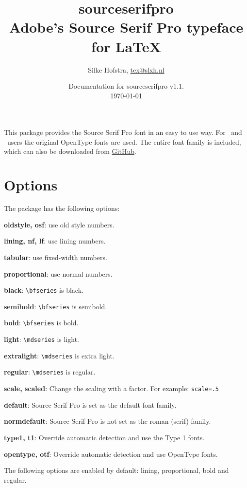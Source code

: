 \documentclass[10pt,a4paper,english]{article}
\title{\bfseries
	\Huge sourceserifpro\\
	\Large Adobe's Source Serif Pro typeface for \LaTeX
}
\author{Silke Hofstra, \href{mailto:tex@slxh.nl}{tex@slxh.nl}}
\date{Documentation for sourceserifpro v1.1.\\ \today}
\begin{document}
\maketitle
\begin{multicols}{2}
This package provides the Source Serif Pro font in an easy to use way. For \XeLaTeX\ and \LuaLaTeX\ users the original OpenType fonts are used. The entire font family is included, which can also be downloaded from \href{https://github.com/adobe-fonts/source-serif-pro}{GitHub}.

\section{Options}
The package has the following options:
\begin{itemize*}
	\item \textbf{oldstyle, osf}:  use old style numbers.
	\item \textbf{lining, nf, lf}: use lining numbers.
	\item \textbf{tabular}:        use fixed-width numbers.
	\item \textbf{proportional}:   use normal numbers.
	\item \textbf{black}:          \texttt{\textbackslash bfseries} is black.
	\item \textbf{semibold}:       \texttt{\textbackslash bfseries} is semibold.
	\item \textbf{bold}:           \texttt{\textbackslash bfseries} is bold.
	\item \textbf{light}:          \texttt{\textbackslash mdseries} is light.
	\item \textbf{extralight}:     \texttt{\textbackslash mdseries} is extra light.
	\item \textbf{regular}:        \texttt{\textbackslash mdseries} is regular.
	\item \textbf{scale, scaled}:  Change the scaling with a factor. For example:  \texttt{scale=.5}
	\item \textbf{default}:        Source Serif Pro is set as the default font family.
	\item \textbf{normdefault}:    Source Serif Pro is not set as the roman (serif) family.
	\item \textbf{type1, t1}:      Override automatic detection and use the Type 1 fonts.
	\item \textbf{opentype, otf}:  Override automatic detection and use OpenType fonts.
\end{itemize*}
The following options are enabled by default: lining, proportional, bold and regular.


\end{multicols}
\end{document}

